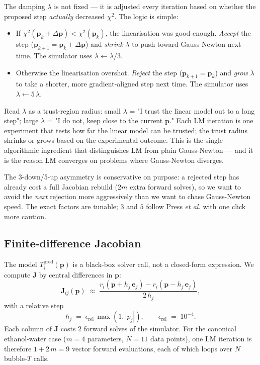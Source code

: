 \documentclass[11pt,a4paper]{article}
\newcommand{\Jac}{\mathbf{J}}
\newcommand{\pv}{\mathbf{p}}                          %
\begin{document}
The damping $\lambda$ is not fixed --- it is adjusted every
iteration based on whether the proposed step \emph{actually}
decreased $\chi^2$. The logic is simple:
\begin{itemize}[leftmargin=*,nosep]
  \item If $\chi^2(\pv_k + \Delta\pv) < \chi^2(\pv_k)$, the
        linearisation was good enough. \emph{Accept} the step
        ($\pv_{k+1} = \pv_k + \Delta\pv$) and \emph{shrink}
        $\lambda$ to push toward Gauss-Newton next time. The
        simulator uses $\lambda \leftarrow \lambda / 3$.
  \item Otherwise the linearisation overshot. \emph{Reject} the
        step ($\pv_{k+1} = \pv_k$) and \emph{grow} $\lambda$ to
        take a shorter, more gradient-aligned step next time. The
        simulator uses $\lambda \leftarrow 5\,\lambda$.
\end{itemize}

\begin{intuition}
Read $\lambda$ as a trust-region radius: small $\lambda$ = "I
trust the linear model out to a long step"; large $\lambda$ = "I
do not, keep close to the current $\pv$." Each LM iteration is
one experiment that tests how far the linear model can be
trusted; the trust radius shrinks or grows based on the
experimental outcome. This is the single algorithmic ingredient
that distinguishes LM from plain Gauss-Newton --- and it is the
reason LM converges on problems where Gauss-Newton diverges.
\end{intuition}

The 3-down/5-up asymmetry is conservative on purpose: a rejected
step has already cost a full Jacobian rebuild ($2m$ extra forward
solves), so we want to avoid the \emph{next} rejection more
aggressively than we want to chase Gauss-Newton speed. The exact
factors are tunable; $3$ and $5$ follow Press \textit{et al.}
\cite{NumericalRecipes} with one click more caution.

\subsection{Finite-difference Jacobian}

The model $T_i^{\mathrm{pred}}(\pv)$ is a black-box solver call,
not a closed-form expression. We compute $\Jac$ by central
differences in $\pv$:
\begin{equation}
   \Jac_{ij}(\pv)
   \;\approx\;
   \frac{r_i(\pv + h_j\,\mathbf{e}_j) - r_i(\pv - h_j\,\mathbf{e}_j)}{2\,h_j},
\end{equation}
with a relative step
\begin{equation}
   h_j \;=\; \epsilon_{\mathrm{rel}}\,\max(1, |p_j|),
   \qquad
   \epsilon_{\mathrm{rel}} \;=\; 10^{-4}.
\end{equation}
Each column of $\Jac$ costs $2$ forward solves of the simulator. For
the canonical ethanol-water case ($m=4$ parameters, $N=11$ data
points), one LM iteration is therefore $1 + 2\,m = 9$ vector forward
evaluations, each of which loops over $N$ bubble-$T$ calls.
\end{document}
